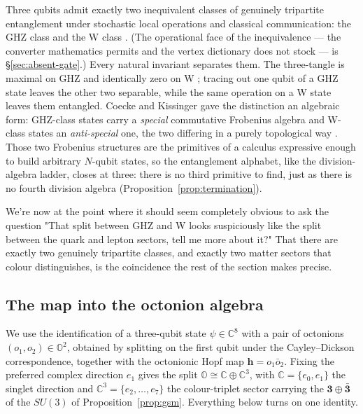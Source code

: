 Three qubits admit exactly two inequivalent classes of genuinely tripartite entanglement under
stochastic local operations and classical communication: the GHZ class and the W class
\autocite{durvidalcirac2000three}. (The operational face of the inequivalence --- the converter
mathematics permits and the vertex dictionary does not stock --- is \S\ref{sec:absent-gate}.) Every natural invariant separates them. The three-tangle is
maximal on GHZ and identically zero on W \autocite{coffmankunduwootters2000}; tracing
out one qubit of a GHZ state leaves the other two separable, while the same operation on a W state
leaves them entangled. Coecke and Kissinger gave the distinction an algebraic form: GHZ-class states
carry a \emph{special} commutative Frobenius algebra and W-class states an \emph{anti-special} one,
the two differing in a purely topological way \autocite{coeckekissinger2010compositional}. Those two
Frobenius structures are the primitives of a calculus expressive enough to build arbitrary $N$-qubit
states, so the entanglement alphabet, like the division-algebra ladder, closes at three: there is no
third primitive to find, just as there is no fourth division algebra (Proposition~\ref{prop:termination}).

We're now at the point where it should seem completely obvious to ask the question "That split between GHZ and W looks suspiciously like the split between 
the quark and lepton sectors, tell me more about it?" That there are exactly two genuinely tripartite classes, and exactly two matter sectors that colour
distinguishes, is the coincidence the rest of the section makes precise.

\subsection{The map into the octonion algebra}

We use the identification of a three-qubit state $\psi \in \mathbb{C}^8$ with a pair of octonions
$(o_1, o_2) \in \mathbb{O}^2$, obtained by splitting on the first qubit under the Cayley--Dickson
correspondence, together with the octonionic Hopf map $\mathbf{h} = o_1\bar{o}_2$. Fixing the
preferred complex direction $e_1$ gives the split $\mathbb{O} \cong \mathbb{C} \oplus \mathbb{C}^3$,
with $\mathbb{C} = \{e_0, e_1\}$ the singlet direction and $\mathbb{C}^3 = \{e_2,\dots,e_7\}$ the
colour-triplet sector carrying the $\mathbf{3} \oplus \bar{\mathbf{3}}$ of the $SU(3)$ of
Proposition~\ref{prop:gsm}. Everything below turns on one identity.

